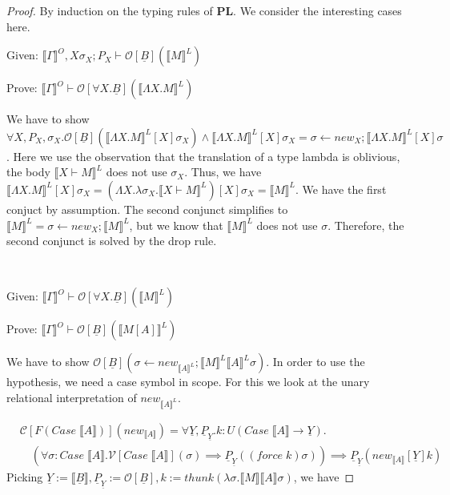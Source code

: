 \documentclass[acmsmall]{acmart}
\newcommand{\den}[1]{\llbracket #1\rrbracket}
\begin{document}
\begin{proof}
  By induction on the typing rules of $\mathbf{PL}$. We consider the interesting cases here.

  \quad \begin{minipage}[r]{0.9\linewidth}

    Given: $\den{\Gamma}^O,X\sigma_X;P_X \vdash \mathcal{O}[\underline{B}](\den{M}^L)$

    Prove: $\den{\Gamma}^O \vdash \mathcal{O}[\forall X. \underline{B}](\den{\Lambda X. M}^L)$

    \quad We have to show $\forall X,P_X,\sigma_X.\mathcal{O}[\underline{B}](\den{\Lambda X.M}^L[X]\sigma_X) \land \den{\Lambda X. M}^L[X]\sigma_X = \sigma \leftarrow new_X;\den{\Lambda X. M}^L[X]\sigma$. Here we use the observation that the translation of a type lambda is oblivious, the body $\den{X \vdash M}^L$ does not use $\sigma_X.$ Thus, we have $\den{\Lambda X. M}^L[X]\sigma_X = (\Lambda X.\lambda \sigma_X.\den{X \vdash M}^L)[X]\sigma_X = \den{M}^L$. We have the first conjuct by assumption. The second conjunct simplifies to $\den{M}^L = \sigma \leftarrow new_X; \den{M}^L$, but we know that $\den{M}^L$ does not use $\sigma$. Therefore, the second conjunct is solved by the drop rule.
  \end{minipage}\\
  \quad \begin{minipage}{0.9\linewidth}


  Given: $\den{\Gamma}^O \vdash \mathcal{O}[\forall X. \underline{B}](\den{M}^L)$
  
  Prove: $\den{\Gamma}^O \vdash \mathcal{O}[\underline{B}](\den{M[A]}^L)$

  \quad We have to show $\mathcal{O}[\underline{B}](\sigma \leftarrow new_{\den{A}^L};\den{M}^L\den{A}^L\sigma)$. In order to use the hypothesis, we need a case symbol in scope. For this we look at the unary relational interpretation of $new_{\den{A}^L}$.

  \begin{align*}
    &\mathcal{C}[F(Case\;\den{A})](new_{\den{A}}) = \forall \underline{Y},\underline{P}_{\underline{Y}}.k : U(Case\; \den{A} \to \underline{Y}). \\
    &\quad(\forall \sigma : Case\;\den{A}. \mathcal{V}[Case\;\den{A}](\sigma) \implies \underline{P}_{\underline{Y}}((force\;k)\sigma)) \implies \underline{P}_{\underline{Y}}(new_{\den{A}}[\underline{Y}]k) 
  \end{align*}
Picking $\underline{Y}:=\den{\underline{B}},\underline{P}_{\underline{Y}} := \mathcal{O}[\underline{B}],k:= thunk(\lambda \sigma. \den{M}\den{A}\sigma)$, we have


\end{minipage}
\end{proof}
\end{document}
